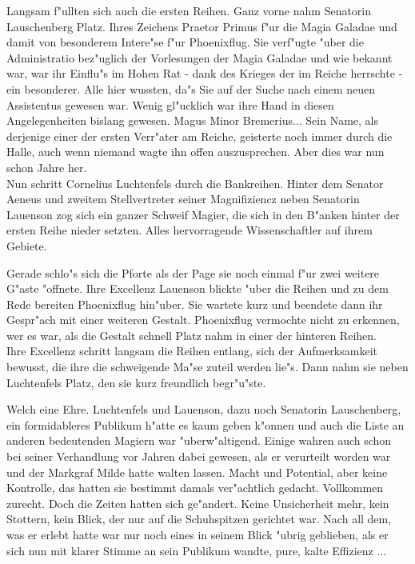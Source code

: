 \documentclass[a5paper,8pt]{book}
\begin{document}
Langsam f"ullten sich auch die ersten Reihen. Ganz vorne nahm Senatorin Lauschenberg Platz. Ihres Zeichens Praetor Primus f"ur die Magia Galadae und damit von besonderem 
Intere"se f"ur Phoenixflug. Sie verf"ugte "uber die Administratio bez"uglich der Vorlesungen der Magia Galadae und wie bekannt war, war ihr Einflu"s im Hohen Rat - dank 
des Krieges der im Reiche herrschte - ein besonderer. Alle hier wussten, da"s Sie auf der Suche nach einem neuen Assistentus gewesen war. Wenig gl"ucklich war ihre Hand in 
diesen Angelegenheiten bislang gewesen. Magus Minor Bremerius... Sein Name, als derjenige einer der ersten Verr"ater am Reiche, geisterte noch immer durch die Halle, auch 
wenn niemand wagte ihn offen auszusprechen. Aber dies war nun schon Jahre her.\\

Nun schritt Cornelius Luchtenfels durch die Bankreihen. Hinter dem Senator Aeneus und zweitem Stellvertreter seiner Magnifiziencz neben Senatorin Lauenson zog sich ein ganzer 
Schweif Magier, die sich in den B"anken hinter der ersten Reihe nieder setzten. Alles hervorragende Wissenschaftler auf ihrem Gebiete.\

Gerade schlo"s sich die Pforte als der Page sie noch einmal f"ur zwei weitere G"aste "offnete. Ihre Excellenz Lauenson blickte "uber die Reihen und zu dem Rede bereiten 
Phoenixflug hin"uber. Sie wartete kurz und beendete dann ihr Gespr"ach mit einer weiteren Gestalt. Phoenixflug vermochte nicht zu erkennen, wer es war, als die Gestalt schnell 
Platz nahm in einer der hinteren Reihen.\\

Ihre Excellenz schritt langsam die Reihen entlang, sich der Aufmerksamkeit bewusst, die ihre die schweigende Ma"se zuteil werden lie"s. Dann nahm sie neben Luchtenfels Platz, 
den sie kurz freundlich begr"u"ste.\

Welch eine Ehre. Luchtenfels und Lauenson, dazu noch Senatorin Lauschenberg, ein formidableres Publikum h"atte es kaum geben k"onnen und auch die Liste an anderen bedeutenden 
Magiern war "uberw"altigend. Einige wahren auch schon bei seiner Verhandlung vor Jahren dabei gewesen, als er verurteilt worden war und der Markgraf Milde hatte walten lassen. 
Macht und Potential, aber keine Kontrolle, das hatten sie bestimmt damals ver"achtlich gedacht. Vollkommen zurecht. Doch die Zeiten hatten sich ge"andert. Keine Unsicherheit 
mehr, kein Stottern, kein Blick, der nur auf die Schuhspitzen gerichtet war. Nach all dem, was er erlebt hatte war nur noch eines in seinem Blick "ubrig geblieben, als er sich 
nun mit klarer Stimme an sein Publikum wandte, pure, kalte Effizienz ...\\
\end{document}
